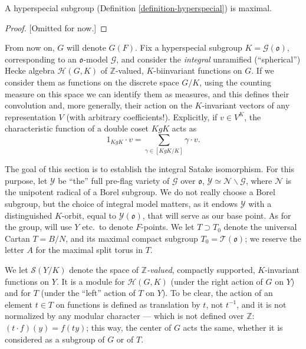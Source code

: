 \begin{proposition}
 \label{proposition-hyperspecial-maximal}
A hyperspecial subgroup (Definition \ref{definition-hyperspecial}) is maximal.
\end{proposition}

\begin{proof}
 
 [Omitted for now.]
\end{proof}


From now on, $G$ will denote $G(F)$. 
Fix a hyperspecial subgroup $K = \mathcal G(\mathfrak o)$, corresponding to an $\mathfrak o$-model $\mathcal G$, and consider the \emph{integral} unramified (``spherical'') Hecke algebra $\mathcal H(G,K)$ of $\mathbb Z$-valued, $K$-biinvariant functions on $G$. If we consider them as functions on the discrete space $G/K$, using the counting measure on this space we can identify them as measures, and this defines their convolution and, more generally, their action on the $K$-invariant vectors of any representation $V$ (with arbitrary coefficients!). Explicitly, if $v\in V^K$, the characteristic function of a double coset $KgK$ acts as 
$$ 1_{KgK}\cdot v = \sum_{\gamma \in [KgK/K]} \gamma\cdot v.$$

The goal of this section is to establish the integral Satake isomorphism. For this purpose, let $\mathcal Y$ be ``the'' full pre-flag variety of $\mathcal G$ over $\mathfrak o$, $\mathcal Y \simeq \mathcal N\backslash \mathcal G$, where $\mathcal N$ is the unipotent radical of a Borel subgroup. We do not really choose a Borel subgroup, but the choice of integral model matters, as it endows $\mathcal Y$ with a distinguished $K$-orbit, equal to $\mathcal Y(\mathfrak o)$, that will serve as our base point. As for the group, will use $Y$ etc.\ to denote $F$-points. We let $T\supset T_0$ denote the universal Cartan $T=B/N$, and its maximal compact subgroup $T_0=\mathcal T(\mathfrak o)$; we reserve the letter $A$ for the maximal split torus in $T$. 

We let $\mathcal S(Y/K)$ denote the space of \emph{$\mathbb Z$-valued}, compactly supported, $K$-invariant functions on $Y$. It is a module for $\mathcal H(G,K)$ (under the right action of $G$ on $Y$) and for $T$ (under the ``left'' action of $T$ on $Y$). To be clear, the action of an element $t\in T$ on functions is defined as translation by $t$, not $t^{-1}$, and it is not normalized by any modular character --- which is not defined over $\mathbb Z$: $(t\cdot f)(y) = f(ty)$; this way, the center of $G$ acts the same, whether it is considered as a subgroup of $G$ or of $T$.


